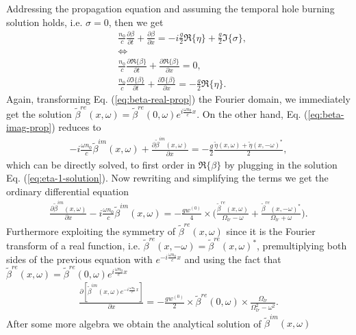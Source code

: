\documentclass[onecolumn,secnumarabic,amssymb, nobibnotes, aip, prd]{revtex4-1}
\def\p{\partial}
\def\t{\tilde}
\def\om{\omega}
\begin{document}
Addressing the propagation equation and assuming the temporal hole burning solution holds, i.e. $\sigma = 0$, then we get 
\begin{subequations}
\label{eq:propagation-eq2}
\begin{align}
&\frac{n_0}{c}\frac{\p \beta}{\p t} + \frac{\p \beta}{\p x} = -i\frac{g}{2}\Re\{\eta\}+\frac{g}{2}\Im\{\sigma\}, \nonumber \\
	&{\Leftrightarrow} \nonumber \\
&	\frac{n_0}{c}\frac{\p \Re\{\beta\}}{\p t} + \frac{\p \Re\{\beta\}}{\p x} = 0, \label{eq:beta-real-prop} \\
&	\frac{n_0}{c}\frac{\p \Im\{\beta\}}{\p t} + \frac{\p \Im\{\beta\}}{\p x} = -\frac{g}{2}\Re\{\eta\}. \label{eq:beta-imag-prop} 
\end{align}
\end{subequations}
Again, transforming Eq. (\ref{eq:beta-real-prop}) the Fourier domain, we immediately get the solution $\t\beta^{re}(x,\om) = \t\beta^{re}(0,\om)e^{i\frac{\om n_0}{c}x}$. On the other hand, Eq. (\ref{eq:beta-imag-prop}) reduces to 
\begin{align}
-i\frac{\om n_0}{c}\t\beta^{im}(x,\om) + \frac{\p \t\beta^{im}(x,\om)}{\p x} = -\frac{g}{2}\frac{\t\eta(x,\om)+\t\eta(x,-\om)^*}{2}, \label{eq:beta-imag-prop-fourier} 
\end{align}
which can be directly solved, to first order in $\Re\{\beta\}$ by plugging in the solution Eq. (\ref{eq:eta-1-solution}). Now rewriting and simplifying the terms we get the ordinary differential equation 
\begin{align}
\frac{\p \t\beta^{im}(x,\om)} {\p x} -i\frac{\om n_0}{c}\t\beta^{im}(x,\om)  = -\frac{g w^{(0)} }{4}\times  \big(\frac{\t\beta^{re}(x,\om)}{\Omega_{lr}-\om} + \frac{\t\beta^{re}(x,-\om)^* }{\Omega_{lr}+\om} \big).
\end{align}
Furthermore exploiting the symmetry of $\t\beta^{re}(x,\om)$ since it is the Fourier transform of a real function, i.e.  $\t\beta^{re}(x,-\om)  =  \t\beta^{re}(x,\om)^*$, premultiplying both sides of the previous equation with $e^{-i\frac{\om n_0}{c}x}$ and using the fact that $\t\beta^{re}(x,\om) = \t\beta^{re}(0,\om)e^{i\frac{\om n_0}{c}x}$
\begin{align}
\frac{\p \left [ \t\beta^{im}(x,\om)e^{-i\frac{\om n_0}{c}x} \right] } {\p x}  = -\frac{g w^{(0)} }{2}\times  \t\beta^{re}(0,\om) \times\frac{\Omega_{lr}}{\Omega_{lr}^2-\om^2}.
\end{align}
After some more algebra we obtain the analytical solution of $\t\beta^{im}(x,\om)$
\end{document}
